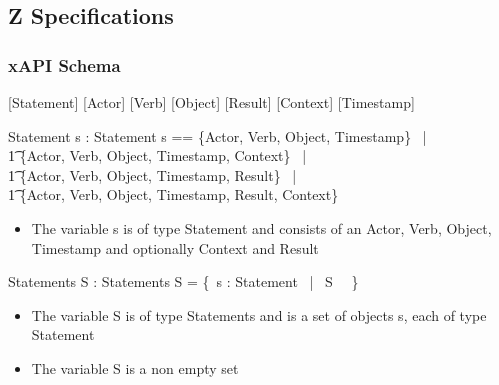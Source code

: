 \documentclass{article}
\begin{document}
  \subsection{Z Specifications}
  \subsubsection{xAPI Schema}
  [Statement]
  [Actor]
  [Verb]
  [Object]
  [Result]
  [Context]
  [Timestamp]
  \begin{schema}{Statement}
    s : Statement
    \where
    s == \{Actor, Verb, Object, Timestamp\} \, |
    \\ \t1 \:\: \{Actor, Verb, Object, Timestamp, Context\} \, |
    \\ \t1 \:\: \{Actor, Verb, Object, Timestamp, Result\} \, |
    \\ \t1 \:\: \{Actor, Verb, Object, Timestamp, Result, Context\}
  \end{schema}
  \begin{itemize}
  \item The variable s is of type Statement and consists of an Actor, Verb, Object, Timestamp and optionally Context and Result
  \end{itemize}
  \begin{schema}{Statements}
    S : Statements
    \where
    S = \{~s : Statement \, | \, S \, \neg \, \emptyset\} \\
  \end{schema}
  \begin{itemize}
  \item The variable S is of type Statements and is a set of objects s, each of type Statement
  \item The variable S is a non empty set
  \end{itemize}
\end{document}
